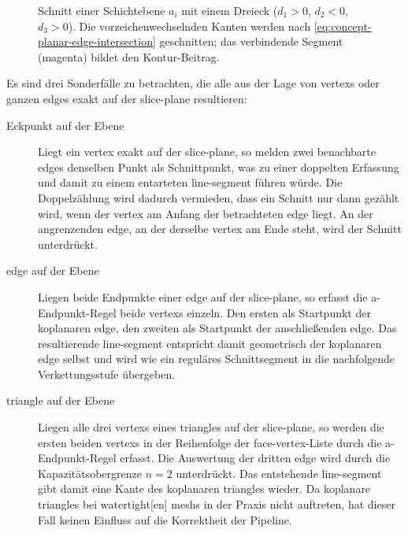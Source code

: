                 \begin{figure}[!ht]
                    \centering
                    
                    \caption[Ebene-Dreieck-Schnitt mit linearer Kanteninterpolation]{
                        Schnitt einer Schichtebene $a_i$ mit einem Dreieck ($d_1 > 0$, $d_2 < 0$, $d_3 > 0$).
                        Die vorzeichenwechselnden Kanten werden nach \cref{eq:concept-planar-edge-intersection} geschnitten; das verbindende Segment (magenta) bildet den Kontur-Beitrag.
                    }
                    \label{fig:concept-planar-plane-triangle}
                \end{figure}

                Es sind drei Sonderfälle zu betrachten, die alle aus der Lage von \glspl{vertex} oder ganzen \glspl{edge} exakt auf der \gls{slice-plane} resultieren:

                \begin{description}
                    \item[Eckpunkt auf der Ebene]
                    Liegt ein \gls{vertex} exakt auf der \gls{slice-plane}, so melden zwei benachbarte \glspl{edge} denselben Punkt als Schnittpunkt, was zu einer doppelten Erfassung und damit zu einem entarteten \gls{line-segment} führen würde.
                    Die Doppelzählung wird dadurch vermieden, dass ein Schnitt nur dann gezählt wird, wenn der \gls{vertex} am Anfang der betrachteten \gls{edge} liegt.
                    An der angrenzenden \gls{edge}, an der derselbe \gls{vertex} am Ende steht, wird der Schnitt unterdrückt.
                    \item[\Gls{edge} auf der Ebene]
                    Liegen beide Endpunkte einer \gls{edge} auf der \gls{slice-plane}, so erfasst die a-Endpunkt-Regel beide \glspl{vertex} einzeln.
                    Den ersten als Startpunkt der koplanaren \gls{edge}, den zweiten als Startpunkt der anschließenden \gls{edge}.
                    Das resultierende \gls{line-segment} entspricht damit geometrisch der koplanaren \gls{edge} selbst und wird wie ein reguläres Schnittsegment in die nachfolgende Verkettungsstufe übergeben.
                    \item[\Gls{triangle} auf der Ebene]
                    Liegen alle drei \glspl{vertex} eines \glspl{triangle} auf der \gls{slice-plane}, so werden die ersten beiden \glspl{vertex} in der Reihenfolge der \gls{face}-\gls{vertex}-Liste durch die a-Endpunkt-Regel erfasst.
                    Die Auswertung der dritten \gls{edge} wird durch die Kapazitätsobergrenze $n = 2$ unterdrückt.
                    Das entstehende \gls{line-segment} gibt damit eine Kante des koplanaren \glspl{triangle} wieder.
                    Da koplanare \glspl{triangle} bei \gls{watertight}[en] \glspl{mesh} in der Praxis nicht auftreten, hat dieser Fall keinen Einfluss auf die Korrektheit der Pipeline.
                \end{description}

